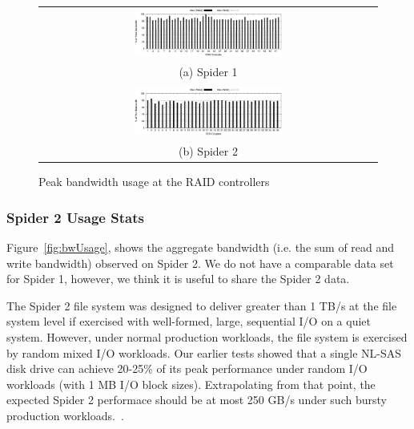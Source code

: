 \begin{figure}[!thb]
\begin{center}
\begin{tabular}{c}
{\includegraphics[width=0.450\textwidth]{./figs/spider1-bw-perc-max.eps}}\\
{(a) Spider 1}\\
\\
{\includegraphics[width=0.450\textwidth]{./figs/spider2-bw-perc-max.eps}}\\
{(b) Spider 2}\\
\end{tabular}
\vspace{-0.1in}
\caption{Peak bandwidth usage at the RAID controllers}
\label{fig:ddnpeakBW}
\end{center}
\end{figure}

\subsubsection{Spider 2 Usage Stats}

Figure~\ref{fig:bwUsage}, shows the aggregate bandwidth (i.e. the sum of read
and write bandwidth) observed on Spider 2. We do not have a comparable data set
for Spider 1, however, we think it is useful to share the Spider 2 data. 

The Spider 2 file system was designed to deliver greater than 1 TB/s at the file system level 
if exercised with well-formed, large, sequential I/O on a quiet system. However, under
normal production workloads, the file system is exercised by random mixed I/O
workloads. Our earlier tests showed that a single NL-SAS disk drive can achieve
20-25\% of its peak performance under random I/O workloads (with 1 MB I/O block
sizes). Extrapolating from that point, the expected Spider 2 performace should be 
at most 250 GB/s under such bursty production workloads.~\cite{bestpractices}.

